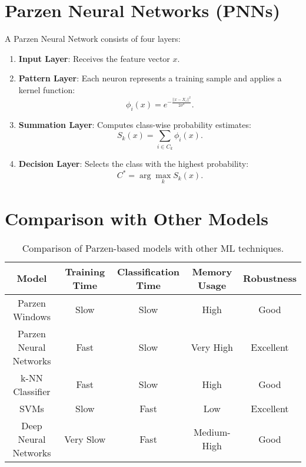 \documentclass{article}
\begin{document}
\section{Parzen Neural Networks (PNNs)}
A Parzen Neural Network consists of four layers:
\begin{enumerate}
    \item \textbf{Input Layer}: Receives the feature vector $x$.
    \item \textbf{Pattern Layer}: Each neuron represents a training sample and applies a kernel function:
    \begin{equation}
        \phi_i(x) = e^{-\frac{||x - X_i||^2}{2\sigma^2}}.
    \end{equation}
    \item \textbf{Summation Layer}: Computes class-wise probability estimates:
    \begin{equation}
        S_k(x) = \sum_{i \in C_k} \phi_i(x).
    \end{equation}
    \item \textbf{Decision Layer}: Selects the class with the highest probability:
    \begin{equation}
        C^* = \arg \max_k S_k(x).
    \end{equation}
\end{enumerate}

\section{Comparison with Other Models}
\begin{table}[h]
    \centering
    \begin{tabular}{|c|c|c|c|c|}
        \hline
        \textbf{Model} & \textbf{Training Time} & \textbf{Classification Time} & \textbf{Memory Usage} & \textbf{Robustness} \\
        \hline
        Parzen Windows & Slow & Slow & High & Good \\
        Parzen Neural Networks & Fast & Slow & Very High & Excellent \\
        k-NN Classifier & Fast & Slow & High & Good \\
        SVMs & Slow & Fast & Low & Excellent \\
        Deep Neural Networks & Very Slow & Fast & Medium-High & Good \\
        \hline
    \end{tabular}
    \caption{Comparison of Parzen-based models with other ML techniques.}
\end{table}
\end{document}
